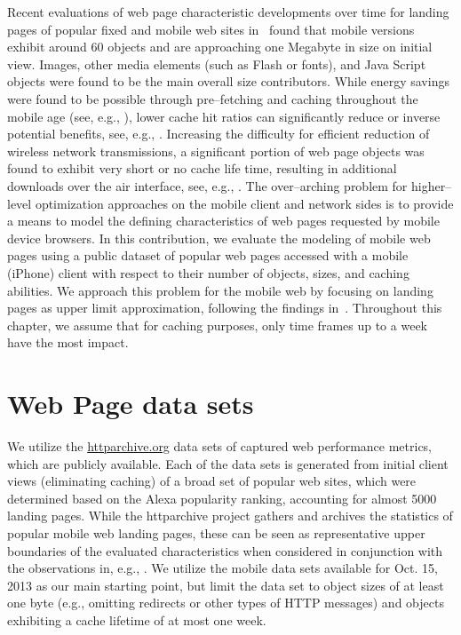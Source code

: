 Recent evaluations of web page characteristic developments over time for landing pages of popular fixed and mobile web sites in~\cite{JoSe14Commag} found that mobile versions exhibit around 60 objects and are approaching one Megabyte in size on initial view. 
Images, other media elements (such as Flash or fonts), and Java Script objects were found to be the main overall size contributors.
While energy savings were found to be possible through pre--fetching and caching throughout the mobile age (see, e.g., \cite{SaIs02, ShKuDaWa05,ThChWo13}),
lower cache hit ratios can significantly reduce or inverse potential benefits, see, e.g., \cite{Wang:2012ks,Marquez:2008wf}.
Increasing the difficulty for efficient reduction of wireless network transmissions, a significant portion of web page objects was found to exhibit very short or no cache life time, resulting in additional downloads over the air interface, see, e.g., \cite{JoSe14Commag,Qian:2014dw,JoSe14GreenComm}.
The over--arching problem for higher--level optimization approaches on the mobile client and network sides is to provide a means to model the defining characteristics of web pages requested by mobile device browsers. 
In this contribution, we evaluate the modeling of mobile web pages using a public dataset of popular web pages accessed with a mobile (iPhone) client with respect to their number of objects, sizes, and caching abilities.
We approach this problem for the mobile web by focusing on landing pages as upper limit approximation, following the findings in~\cite{BuMaSe13}. Throughout this chapter, we assume that for caching purposes, only time frames up to a week have the most impact.

\section*{Web Page data sets}
\label{s:data}
We utilize the \url{httparchive.org} data sets of captured web performance metrics, which are publicly available. 
Each of the data sets is generated from initial client views (eliminating caching) of a broad set of popular web sites, which were determined based on the Alexa popularity ranking, accounting for almost 5000 landing pages. 
While the httparchive project gathers and archives the statistics of popular mobile web landing pages, these can be seen as representative upper boundaries of the evaluated characteristics when considered in conjunction with the observations in, e.g.,  \cite{BuMaSe13}.
We utilize the mobile data sets available for Oct. 15, 2013 as our main starting point, but limit the data set to object sizes of at least one byte (e.g., omitting redirects or other types of HTTP messages) and objects exhibiting a cache lifetime of at most one week.

